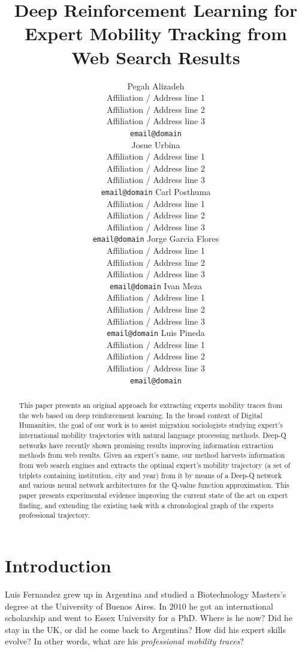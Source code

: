 \documentclass[11pt,a4paper]{article}
\title{Deep Reinforcement Learning for Expert Mobility Tracking from Web Search Results}
\author{Pegah Alizadeh \\
  Affiliation / Address line 1 \\
  Affiliation / Address line 2 \\
  Affiliation / Address line 3 \\
  {\tt email@domain} \\\And
  Josue Urbina \\
  Affiliation / Address line 1 \\
  Affiliation / Address line 2 \\
  Affiliation / Address line 3 \\
  {\tt email@domain}
  Carl Posthuma \\
  Affiliation / Address line 1 \\
  Affiliation / Address line 2 \\
  Affiliation / Address line 3 \\
  {\tt email@domain} 
  Jorge Garcia Flores \\
  Affiliation / Address line 1 \\
  Affiliation / Address line 2 \\
  Affiliation / Address line 3 \\
  {\tt email@domain} 
  Ivan Meza \\
  Affiliation / Address line 1 \\
  Affiliation / Address line 2 \\
  Affiliation / Address line 3 \\
  {\tt email@domain} 
  Luis Pineda \\
  Affiliation / Address line 1 \\
  Affiliation / Address line 2 \\
  Affiliation / Address line 3 \\
  {\tt email@domain}
  \\}
\date{}
\begin{document}
\maketitle
\begin{abstract}

  This paper presents an original approach for extracting experts mobility traces from the web based on deep reinforcement learning. In the broad context of Digital Humanities, the goal of our work is to assist migration sociologists studying expert's international mobility trajectories with natural language processing methods. Deep-Q networks have recently shown promising results improving information extraction methods from web results. Given an expert's name, our method harvests information from web search engines and extracts the optimal expert's mobility trajectory (a set of triplets containing institution, city and year) from it by means of a Deep-Q network and various neural network architectures for the Q-value function approximation. This paper presents experimental evidence improving the current state of the art on expert finding, and extending the existing task with a chronological graph of the experts professional trajectory. 

\end{abstract}

\section{Introduction}
Luis Fernandez grew up in Argentina and studied a Biotechnology Masters's degree at the University of Buenos Aires. In $2010$ he got an international scholarship and went to Essex University for a PhD. Where is he now? Did he stay in the UK, or did he come back to Argentina? How did his expert skills evolve? In other words, what are his \textit{professional mobility traces}?
\end{document}
